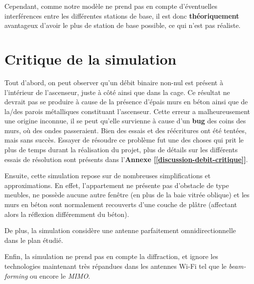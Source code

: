 Cependant, comme notre modèle ne prend pas en compte d'éventuelles interférences entre les différentes stations de base, il est donc \textbf{théoriquement} avantageux d'avoir le plus de station de base possible, ce qui n'est pas réaliste.

\section{Critique de la simulation}

Tout d'abord, on peut observer qu'un débit binaire non-nul est présent à l'intérieur de l'ascenseur, juste à côté ainsi que dans la cage. Ce résultat ne devrait pas se produire à cause de la présence d'épais murs en béton ainsi que de la/des parois métalliques constituant l'ascenseur. Cette erreur a malheureusement une origine inconnue, il se peut qu'elle survienne à cause d'un \textbf{bug} des coins des murs, où des ondes passeraient. Bien des essais et des réécritures ont été tentées, mais sans succès. Essayer de résoudre ce problème fut une des choses qui prit le plus de temps durant la réalisation du projet, plus de détails sur les différents essais de résolution sont présents dans l'\textbf{Annexe [\ref{discussion-debit-critique}]}.

Ensuite, cette simulation repose sur de nombreuses simplifications et approximations. En effet, l'appartement ne présente pas d'obstacle de type meubles, ne possède aucune autre fenêtre (en plus de la baie vitrée oblique) et les murs en béton sont normalement recouverts d'une couche de plâtre (affectant alors la réflexion différemment du béton). 

De plus, la simulation considère une antenne parfaitement omnidirectionnelle dans le plan étudié. 

Enfin, la simulation ne prend pas en compte la diffraction, et ignore les technologies maintenant très répandues dans les antennes Wi-Fi tel que le \textit{beam-forming} ou encore le \textit{MIMO}.
